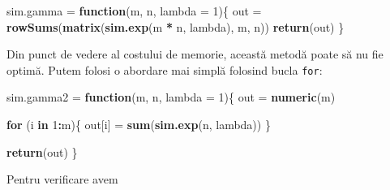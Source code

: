 \documentclass[]{article}
\newenvironment{Shaded}{\begin{snugshade}}{\end{snugshade}}
\newcommand{\KeywordTok}[1]{\textcolor[rgb]{0.13,0.29,0.53}{\textbf{#1}}}
\newcommand{\DataTypeTok}[1]{\textcolor[rgb]{0.13,0.29,0.53}{#1}}
\newcommand{\DecValTok}[1]{\textcolor[rgb]{0.00,0.00,0.81}{#1}}
\newcommand{\StringTok}[1]{\textcolor[rgb]{0.31,0.60,0.02}{#1}}
\newcommand{\ControlFlowTok}[1]{\textcolor[rgb]{0.13,0.29,0.53}{\textbf{#1}}}
\newcommand{\OperatorTok}[1]{\textcolor[rgb]{0.81,0.36,0.00}{\textbf{#1}}}
\newcommand{\NormalTok}[1]{#1}
\begin{document}
\begin{Shaded}
\begin{Highlighting}[]
\NormalTok{sim.gamma =}\StringTok{ }\ControlFlowTok{function}\NormalTok{(m, n, }\DataTypeTok{lambda =} \DecValTok{1}\NormalTok{)\{}
\NormalTok{  out =}\StringTok{ }\KeywordTok{rowSums}\NormalTok{(}\KeywordTok{matrix}\NormalTok{(}\KeywordTok{sim.exp}\NormalTok{(m }\OperatorTok{*}\StringTok{ }\NormalTok{n, lambda), m, n))}
  \KeywordTok{return}\NormalTok{(out)}
\NormalTok{\}}
\end{Highlighting}
\end{Shaded}

Din punct de vedere al costului de memorie, această metodă poate să nu
fie optimă. Putem folosi o abordare mai simplă folosind bucla
\texttt{for}:

\begin{Shaded}
\begin{Highlighting}[]
\NormalTok{sim.gamma2 =}\StringTok{ }\ControlFlowTok{function}\NormalTok{(m, n, }\DataTypeTok{lambda =} \DecValTok{1}\NormalTok{)\{}
\NormalTok{  out =}\StringTok{ }\KeywordTok{numeric}\NormalTok{(m)}
  
  \ControlFlowTok{for}\NormalTok{ (i }\ControlFlowTok{in} \DecValTok{1}\OperatorTok{:}\NormalTok{m)\{}
\NormalTok{    out[i] =}\StringTok{ }\KeywordTok{sum}\NormalTok{(}\KeywordTok{sim.exp}\NormalTok{(n, lambda))}
\NormalTok{  \}}
  
  \KeywordTok{return}\NormalTok{(out)}
\NormalTok{\}}
\end{Highlighting}
\end{Shaded}

Pentru verificare avem
\end{document}
